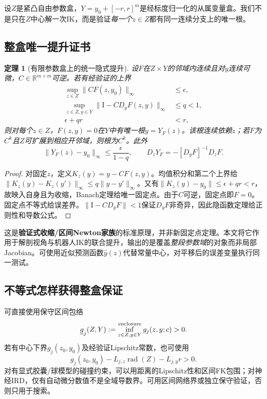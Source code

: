 \documentclass[UTF8,11pt,a4paper,fontset=fandol]{ctexart}
\numberwithin{equation}{section}
\newtheorem{theorem}{定理}[section]
\theoremstyle{definition}
\newcommand{\R}{\mathbb R}
\newcommand{\Id}{\mathrm I}
\begin{document}
设$Z$是紧凸自由参数盒，$Y=y_0+[-r,r]^m$是经标度归一化的从属变量盒。我们不是只在$Z$中心解一次IK，而是验证\emph{每一个}$z\in Z$都有同一连续分支上的唯一根。

\subsection{整盒唯一提升证书}
\begin{theorem}[有限参数盒上的统一隐式提升]\label{thm:box}
设$F$在$Z\times Y$的邻域内连续且对$y$连续可微，$C\in\R^{m\times m}$可逆。若有经验证的上界
\begin{align}
 \sup_{z\in Z}\|C F(z,y_0)\|_\infty&\le\epsilon,\\
 \sup_{z\in Z,y\in Y}\|\Id-C D_yF(z,y)\|_\infty&\le q<1,\\
 \epsilon+qr&<r,
 \label{eq:contraction}
\end{align}
则对每个$z\in Z$，$F(z,y)=0$在$Y$中有唯一根$y=Y_F(z)$。该根连续依赖$z$；若$F$为$C^k$且$Z$可扩展到相应开邻域，则根为$C^k$。此外
\begin{equation}
 \|Y_F(z)-y_0\|_\infty\le\frac{\epsilon}{1-q},\qquad
 D_zY_F=-[D_yF]^{-1}D_zF.
 \label{eq:liftderivative}
\end{equation}
\end{theorem}
\begin{proof}
对固定$z$，定义$K_z(y)=y-CF(z,y)$。均值积分和第二个上界给$\|K_z(y)-K_z(y')\|_\infty\le q\|y-y'\|_\infty$。又有$\|K_z(y)-y_0\|\le\epsilon+qr<r$，故映入自身且为收缩，Banach定理给唯一固定点。由于$C$可逆，固定点即$F=0$。固定点不等式给误差界。$\|\Id-CD_yF\|<1$保证$D_yF$非奇异，因此隐函数定理给正则性和导数公式。
\end{proof}
这是\textbf{验证式收缩/区间Newton家族}的标准原理\cite{cuik2014,krawczyk2025}，并非新固定点定理。本文将它作用于解剖视角与机器人IK的联合提升，输出的是覆盖\emph{整段参数域}的对象而非局部Jacobian。可使用近似预测函数$\widehat y(z)$代替常量中心，对平移后的误差变量执行同一测试。

\subsection{不等式怎样获得整盒保证}
可直接使用保守区间包络
\begin{equation}
 \underline g_j(Z,Y):=\inf^{\rm enclosure}_{z\in Z,y\in Y}g_j(z,y;c)>0.
 \label{eq:marginbox}
\end{equation}
若有中心下界$g_j(z_0,y_0)$及经验证Lipschitz常数，也可使用
\begin{equation}
 g_j(z_0,y_0)-L_{j,z}\operatorname{rad}(Z)-L_{j,y}r>0.
\end{equation}
对有显式胶囊/球模型的碰撞约束，可以用距离的Lipschitz性和区间FK包围；对神经IRD，仅有自动微分数值不是全域导数界。可用区间网络界或独立保守验证，否则只用于搜索。
\end{document}
